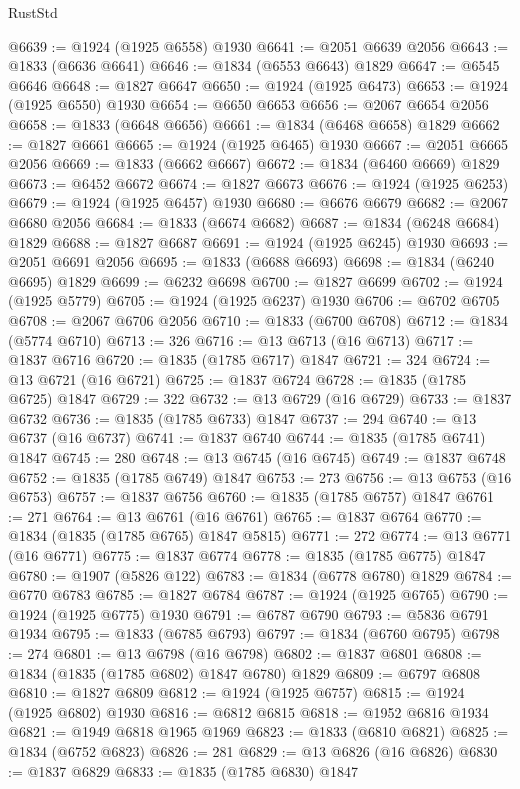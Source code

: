 \begin{lexlean}{RustStd}
\begin{coremodule}
{\begin{coremodule}
{{{{{@6639 := @1924 (@1925 @6558) @1930
@6641 := @2051 @6639 @2056
@6643 := @1833 (@6636 @6641)
@6646 := @1834 (@6553 @6643) @1829
@6647 := @6545 @6646
@6648 := @1827 @6647
@6650 := @1924 (@1925 @6473)
@6653 := @1924 (@1925 @6550) @1930
@6654 := @6650 @6653
@6656 := @2067 @6654 @2056
@6658 := @1833 (@6648 @6656)
@6661 := @1834 (@6468 @6658) @1829
@6662 := @1827 @6661
@6665 := @1924 (@1925 @6465) @1930
@6667 := @2051 @6665 @2056
@6669 := @1833 (@6662 @6667)
@6672 := @1834 (@6460 @6669) @1829
@6673 := @6452 @6672
@6674 := @1827 @6673
@6676 := @1924 (@1925 @6253)
@6679 := @1924 (@1925 @6457) @1930
@6680 := @6676 @6679
@6682 := @2067 @6680 @2056
@6684 := @1833 (@6674 @6682)
@6687 := @1834 (@6248 @6684) @1829
@6688 := @1827 @6687
@6691 := @1924 (@1925 @6245) @1930
@6693 := @2051 @6691 @2056
@6695 := @1833 (@6688 @6693)
@6698 := @1834 (@6240 @6695) @1829
@6699 := @6232 @6698
@6700 := @1827 @6699
@6702 := @1924 (@1925 @5779)
@6705 := @1924 (@1925 @6237) @1930
@6706 := @6702 @6705
@6708 := @2067 @6706 @2056
@6710 := @1833 (@6700 @6708)
@6712 := @1834 (@5774 @6710)
@6713 := 326
@6716 := @13 @6713 (@16 @6713)
@6717 := @1837 @6716
@6720 := @1835 (@1785 @6717) @1847
@6721 := 324
@6724 := @13 @6721 (@16 @6721)
@6725 := @1837 @6724
@6728 := @1835 (@1785 @6725) @1847
@6729 := 322
@6732 := @13 @6729 (@16 @6729)
@6733 := @1837 @6732
@6736 := @1835 (@1785 @6733) @1847
@6737 := 294
@6740 := @13 @6737 (@16 @6737)
@6741 := @1837 @6740
@6744 := @1835 (@1785 @6741) @1847
@6745 := 280
@6748 := @13 @6745 (@16 @6745)
@6749 := @1837 @6748
@6752 := @1835 (@1785 @6749) @1847
@6753 := 273
@6756 := @13 @6753 (@16 @6753)
@6757 := @1837 @6756
@6760 := @1835 (@1785 @6757) @1847
@6761 := 271
@6764 := @13 @6761 (@16 @6761)
@6765 := @1837 @6764
@6770 := @1834 (@1835 (@1785 @6765) @1847 @5815)
@6771 := 272
@6774 := @13 @6771 (@16 @6771)
@6775 := @1837 @6774
@6778 := @1835 (@1785 @6775) @1847
@6780 := @1907 (@5826 @122)
@6783 := @1834 (@6778 @6780) @1829
@6784 := @6770 @6783
@6785 := @1827 @6784
@6787 := @1924 (@1925 @6765)
@6790 := @1924 (@1925 @6775) @1930
@6791 := @6787 @6790
@6793 := @5836 @6791 @1934
@6795 := @1833 (@6785 @6793)
@6797 := @1834 (@6760 @6795)
@6798 := 274
@6801 := @13 @6798 (@16 @6798)
@6802 := @1837 @6801
@6808 := @1834 (@1835 (@1785 @6802) @1847 @6780) @1829
@6809 := @6797 @6808
@6810 := @1827 @6809
@6812 := @1924 (@1925 @6757)
@6815 := @1924 (@1925 @6802) @1930
@6816 := @6812 @6815
@6818 := @1952 @6816 @1934
@6821 := @1949 @6818 @1965 @1969
@6823 := @1833 (@6810 @6821)
@6825 := @1834 (@6752 @6823)
@6826 := 281
@6829 := @13 @6826 (@16 @6826)
@6830 := @1837 @6829
@6833 := @1835 (@1785 @6830) @1847
}}}}}
\end{coremodule}}
\end{coremodule}
\end{lexlean}
